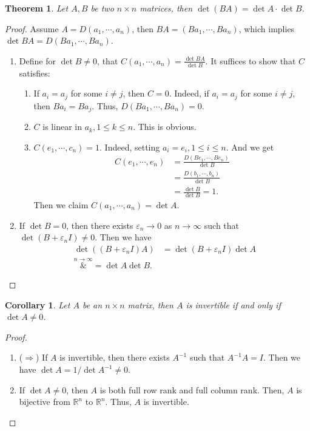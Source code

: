 \documentclass[11pt]{book}
\newtheorem{theorem}{Theorem}[section]
\newtheorem{corollary}{Corollary}[section]
\theoremstyle{definition}
\numberwithin{equation}{subsection}
\begin{document}
\begin{theorem}
Let $A,B$ be two $n\times n$ matrices, then $\det (BA) = \det A\cdot \det B$.
\end{theorem}
\begin{proof}
Assume $A = D(a_1,\cdots,a_n)$, then $BA = (Ba_1,\cdots,Ba_n)$, which implies $\det BA = D(Ba_1,\cdots,Ba_n)$. 
\begin{enumerate}[label=(\arabic*)]
    \item Define for $\det B\neq 0$, that $C(a_1,\cdots,a_n) = \frac{\det BA}{\det B}$. It suffices to show that $C$ satisfies:
    \begin{enumerate}[label=(\roman*)]
        \item If $a_i = a_j$ for some $i\neq j$, then $C = 0$. Indeed, if $a_i = a_j$ for some $i\neq j$, then $Ba_i = Ba_j$. Thus, $D(Ba_1,\cdots,Ba_n) = 0$.
        \item $C$ is linear in $a_k, 1\leq k \leq n$. This is obvious.
        \item $C(e_1,\cdots,c_n) = 1$. Indeed, setting $a_i = e_i, 1\leq i\leq n$. And we get 
        \begin{align*}
            C(e_1,\cdots,e_n) & = \frac{D(Be_1,\cdots,Be_n)}{\det B} \\
            & = \frac{D(b_1,\cdots,b_n)}{\det B} \\
            & = \frac{\det B}{\det B} = 1.
        \end{align*}
        Then we claim $C(a_1,\cdots,a_n) = \det A$.
    \end{enumerate}
    \item If $\det B = 0$, then there exists $\varepsilon_n\to 0$ as $n\to\infty$ such that $\det (B+\varepsilon_n I)\neq 0$. Then we have 
    \begin{align*}
        \det \left((B+\varepsilon_n I)A\right) & = \det (B+\varepsilon_n I) \det A \\
        \overset{n\to\infty}&{=} \det A \det B.
    \end{align*}
\end{enumerate}
\end{proof}

\medskip

\begin{corollary}
Let $A$ be an $n\times n$ matrix, then $A$ is invertible if and only if $\det A\neq 0$.
\end{corollary}
\begin{proof}
~\begin{enumerate}[label=(\arabic*)]
    \item ($\Rightarrow$) If $A$ is invertible, then there exists $A^{-1}$ such that $A^{-1}A = I$. Then we have $\det A = 1/\det A^{-1} \neq 0$.
    \item If $\det A\neq 0$, then $A$ is both full  row rank and full column rank. Then, $A$ is bijective from $\mathbb{R}^n$ to $\mathbb{R}^n$. Thus, $A$ is invertible.
\end{enumerate}
\end{proof}
\end{document}
